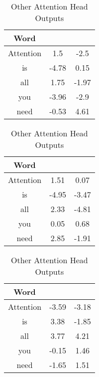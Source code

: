 \documentclass[12pt, letterpaper]{article}
\begin{document}
\begin{enumerate}
\begin{table}[H]
\begin{tabular}{ |c|c|c| } 
\hline
 Word  &  \multicolumn{1}{c}{} \hspace{0.5cm}  &   \hspace{0.5cm}  \\
\hline
Attention &  1.5    & -2.5   \\
\hline
is        & -4.78   & 0.15 \\
\hline
all       & 1.75    & -1.97  \\
\hline
you       & -3.96   & -2.9  \\
\hline
need      & -0.53   &  4.61 \\
\hline
\end{tabular}
\hfill
\begin{tabular}{ |c|c|c| } 
\hline
 Word  &  \multicolumn{1}{c}{} \hspace{0.5cm}  &   \hspace{0.5cm}  \\
\hline
Attention & 1.51   & 0.07   \\
\hline
is        & -4.95  & -3.47 \\
\hline
all       & 2.33   & -4.81  \\
\hline
you       & 0.05   & 0.68   \\
\hline
need      & 2.85   & -1.91  \\
\hline
\end{tabular}
\hfill
\begin{tabular}{ |c|c|c| } 
\hline
 Word  &  \multicolumn{1}{c}{} \hspace{0.5cm}  &   \hspace{0.5cm}  \\
\hline
Attention &  -3.59  & -3.18  \\
\hline
is        &  3.38   & -1.85 \\
\hline
all       &  3.77   & 4.21  \\
\hline
you       &  -0.15  & 1.46  \\
\hline
need      &  -1.65  & 1.51  \\
\hline
\end{tabular}
\caption{Other Attention Head Outputs}
\end{table}


\end{enumerate}
\end{document}

